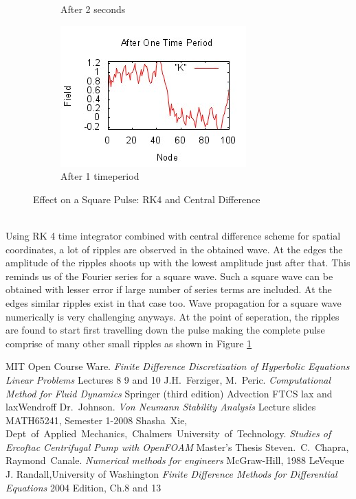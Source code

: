 \documentclass[a4paper,12pt]{report}
\begin{document}
\begin{figure}[h]
\begin{subfigure}[b]{0.5\textwidth}
                \caption{After 2 seconds}
                \label{sqpul2}
	\end{subfigure}
	\begin{subfigure}[b]{0.5\textwidth}
		\includegraphics[width=\textwidth]{sqrk4ctd.jpeg}
                \caption{After 1 timeperiod}
                \label{sqctd}
	\end{subfigure}
\caption{Effect on a Square Pulse: RK4 and Central Difference}
\end{figure}
\\
Using RK 4 time integrator combined with central difference scheme for spatial coordinates, a lot of ripples are observed in the obtained wave. At the edges the amplitude of the ripples shoots up with the lowest amplitude just after that. This reminds us of the Fourier series  for a square wave. Such a square wave can be obtained with lesser error if large number of series terms are included. At the edges similar ripples exist in that case too. Wave propagation for a square wave numerically is very challenging anyways. At the point of seperation, the ripples are found to start first travelling down the pulse making the complete pulse comprise of many other small ripples as shown in Figure \ref{sqpul2}
\begin{thebibliography}{99}
MIT Open Course Ware. \emph{Finite Difference Discretization of Hyperbolic Equations Linear Problems}
Lectures 8 9 and 10
J.H.~Ferziger, M.~Peric. \emph{Computational Method for Fluid Dynamics}
Springer (third edition)
Advection FTCS lax and laxWendroff
Dr.~Johnson. \emph{Von Neumann Stability Analysis}
Lecture slides MATH65241, Semester 1-2008
Shasha~Xie, Dept~of~Applied~Mechanics,~Chalmers~University~of~Technology. \emph{Studies of Ercoftac Centrifugal Pump with OpenFOAM}
Master's Thesis
Steven.~C.~Chapra, Raymond~Canale. \emph{Numerical methods for engineers}
McGraw-Hill, 1988
LeVeque J. Randall,University of Washington \emph{Finite Difference Methods for Differential Equations}
2004 Edition, Ch.8 and 13
\end{thebibliography}
\end{document}

